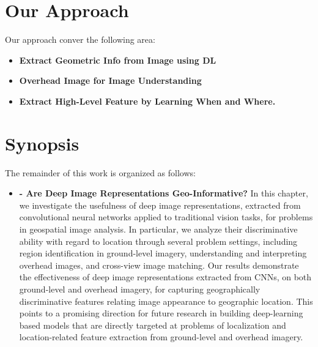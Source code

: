 

\section{Our Approach}
Our approach conver the following area:

\begin{itemize}[noitemsep]

  \item \textbf{Extract Geometric Info from Image using DL}

  \item \textbf{Overhead Image for Image Understanding}

  \item \textbf{Extract High-Level Feature by Learning When and Where.}

\end{itemize}


\section{Synopsis}

The remainder of this work is organized as follows:
  
\begin{itemize}[noitemsep]

  \item \textbf{ - Are Deep Image Representations
    Geo-Informative?} \newline \newline In this chapter, we
    investigate the usefulness of deep image representations,
    extracted from convolutional neural networks applied to
    traditional vision tasks, for problems in geospatial image
    analysis. In particular, we analyze their discriminative ability
    with regard to location through several problem settings,
    including region identification in ground-level imagery,
    understanding and interpreting overhead images, and cross-view
    image matching.  Our results demonstrate the effectiveness of deep
    image representations extracted from CNNs, on both ground-level
    and overhead imagery, for capturing geographically discriminative
    features relating image appearance to geographic location.  This
    points to a promising direction for future research in building
    deep-learning based models that are directly targeted at problems
    of localization and location-related feature extraction from
    ground-level and overhead imagery. \newline

\end{itemize}

